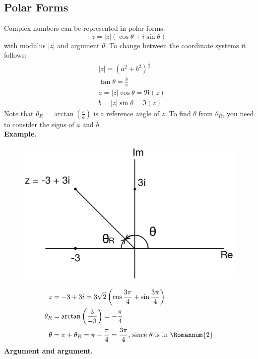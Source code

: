 \documentclass[11pt]{article}
\begin{document}
\subsection{Polar Forms} 
Complex numbers can be represented in polar forms: 
$$z = |z|(\cos\theta + i\sin\theta)$$
with modulus $|z|$ and argument $\theta$. To change between the coordinate systems it follows:
\begin{align*} 
&|z| = \left(a^2 + b^2\right)^{\frac{1}{2}} \\ 
&\tan\theta = \frac{b}{a} \\
&a = |z|\cos\theta= \Re(z) \\
&b = |z|\sin\theta = \Im(z)
\end{align*}
Note that $\theta_R = \arctan(\frac{b}{a})$ is a reference angle of $z$. To find $\theta$ from $\theta_R$, you need to consider the signs of $a$ and $b$. \\
\newline
\textbf{Example.} \\
\vspace{-0.7cm}
\begin{figure}[H]
\includegraphics[scale = 0.165]{2_2}
\centering
\end{figure}
\vspace{-0.7cm}
\begin{align*}
z &= -3 + 3i = 3\sqrt2\left(\cos\frac{3\pi}{4} + \sin\frac{3\pi}{4}\right) \\ 
\theta_R &= \arctan\left(\frac{3}{-3}\right)= -\frac{\pi}{4}\\
\theta &= \pi + \theta_R = \pi -\frac{\pi}{4} = \frac{3\pi}{4} \text{, since } \theta \text{ is in \Romannum{2}}
\end{align*}
\textbf{Argument and argument.}\\
\end{document}
